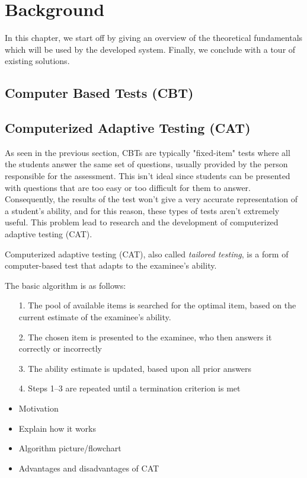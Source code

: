 \documentclass[11pt,a4paper]{report}
\begin{document}
\chapter{Background}
In this chapter, we start off by giving an overview of the theoretical fundamentals which will be used by the developed system. Finally, we conclude with a tour of existing solutions.

\section{Computer Based Tests (CBT)}

\section{Computerized Adaptive Testing (CAT)}
As seen in the previous section, CBTs are typically "fixed-item" tests where all the students answer the same set of questions,  usually provided by the person responsible for the assessment. This isn't ideal since students can be presented with questions that are too easy or too difficult for them to answer. Consequently, the results of the test won't give a very accurate representation of a student's ability, and for this reason, these types of tests aren't extremely useful. This problem lead to research and the development of computerized adaptive testing (CAT). \newline

Computerized adaptive testing (CAT), also called \textit{tailored testing}, is a form of computer-based test that adapts to the examinee's ability. \newline

The basic algorithm is as follows:
\begin{itemize}
\item[1.] The pool of available items is searched for the optimal item, based on the current estimate of the examinee's ability.
\item[2.] The chosen item is presented to the examinee, who then answers it correctly or incorrectly
\item[3.] The ability estimate is updated, based upon all prior answers
\item[4.] Steps 1–3 are repeated until a termination criterion is met
\end{itemize}

\begin{itemize}
\item Motivation
\item Explain how it works
\item Algorithm picture/flowchart
\item Advantages and disadvantages of CAT
\end{itemize}
\end{document}
